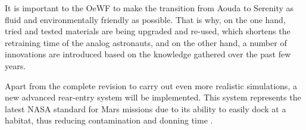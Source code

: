 It is important to the OeWF to make the transition from Aouda to Serenity as fluid and environmentally friendly as possible. That is why, on the one hand, tried and tested materials are being upgraded and re-used, which shortens the retraining time of the analog astronauts, and on the other hand, a number of innovations are introduced based on the knowledge gathered over the past few years. 

Apart from the complete revision to carry out even more realistic simulations, a new advanced rear-entry system will be implemented. This system represents the latest NASA standard for Mars missions due to its ability to easily dock at a habitat, thus reducing contamination and donning time \cite{EVA:2018}.


